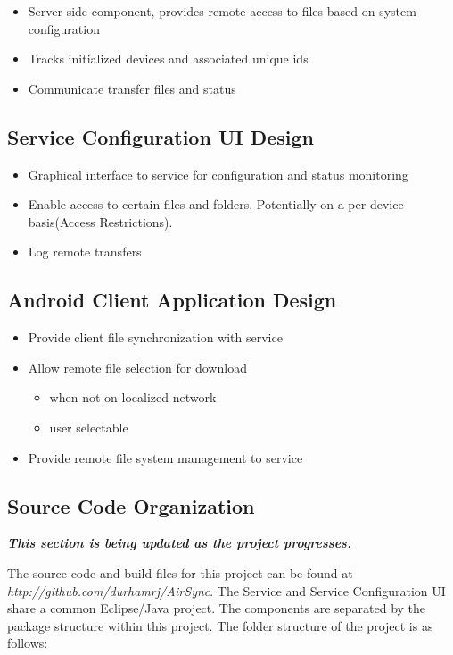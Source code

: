\documentclass[12pt]{article}
\begin{document}
\begin{itemize}
\item Server side component, provides remote access to files based on system configuration
\item Tracks initialized devices and associated unique ids
\item Communicate transfer files and status 
\end{itemize}

\subsection{Service Configuration UI Design}

\begin{itemize}
\item Graphical interface to service for configuration and status monitoring
\item Enable access to certain files and folders.  Potentially on a per device basis(Access Restrictions).
\item Log remote transfers
\end{itemize}

\subsection{Android Client Application Design}

\begin{itemize}
\item Provide client file synchronization with service
\item Allow remote file selection for download 
	\begin{itemize}
	\item when not on localized network
	\item user selectable
	\end {itemize}
\item Provide remote file system management to service
\end{itemize}

\subsection{Source Code Organization}
\begin{center}
\emph{\textbf{This section is being updated as the project progresses.}}\\
\end{center}
The source code and build files for this project can be found at \emph{http://github.com/durhamrj/AirSync}. The Service and Service Configuration UI share a common Eclipse/Java project. The components are separated by the package structure within this project. The  folder structure of the project is as follows:
\end{document}
